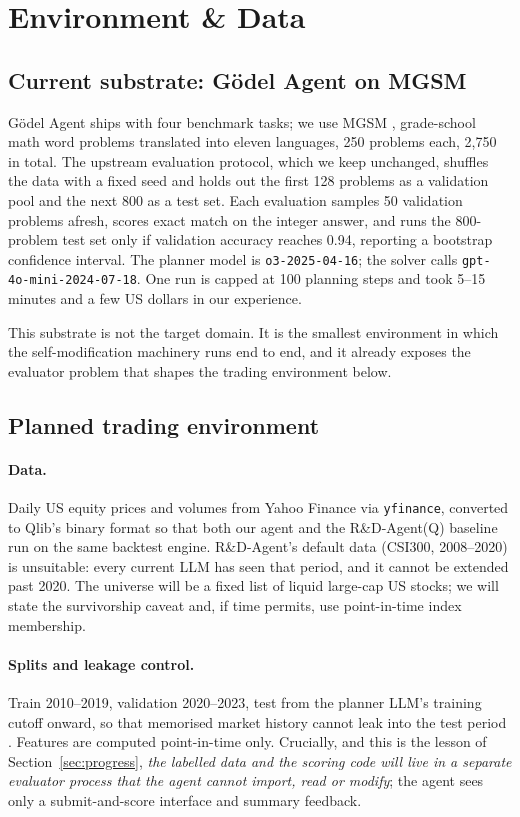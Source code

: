 \documentclass{article}
\begin{document}
\section{Environment \& Data}

\subsection{Current substrate: G\"odel Agent on MGSM}

G\"odel Agent ships with four benchmark tasks; we use MGSM
\citep{shi2022mgsm}, grade-school math word problems translated into eleven
languages, 250 problems each, 2{,}750 in total. The upstream evaluation
protocol, which we keep unchanged, shuffles the data with a fixed seed and
holds out the first 128 problems as a validation pool and the next 800 as a
test set. Each evaluation samples 50 validation problems afresh, scores exact
match on the integer answer, and runs the 800-problem test set only if
validation accuracy reaches 0.94, reporting a bootstrap confidence interval.
The planner model is \texttt{o3-2025-04-16}; the solver calls
\texttt{gpt-4o-mini-2024-07-18}. One run is capped at 100 planning steps and
took 5--15 minutes and a few US dollars in our experience.

This substrate is not the target domain. It is the smallest environment in
which the self-modification machinery runs end to end, and it already
exposes the evaluator problem that shapes the trading environment below.

\subsection{Planned trading environment}

\paragraph{Data.} Daily US equity prices and volumes from Yahoo Finance via
\texttt{yfinance}, converted to Qlib's binary format \citep{yang2020qlib} so
that both our agent and the R\&D-Agent(Q) baseline run on the same backtest
engine. R\&D-Agent's default data (CSI300, 2008--2020) is unsuitable: every
current LLM has seen that period, and it cannot be extended past 2020. The
universe will be a fixed list of liquid large-cap US stocks; we will state the
survivorship caveat and, if time permits, use point-in-time index membership.

\paragraph{Splits and leakage control.} Train 2010--2019, validation
2020--2023, test from the planner LLM's training cutoff onward, so that
memorised market history cannot leak into the test period
\citep{glasserman2023lookahead}. Features are computed point-in-time only.
Crucially, and this is the lesson of Section~\ref{sec:progress}, \emph{the
labelled data and the scoring code will live in a separate evaluator process
that the agent cannot import, read or modify}; the agent sees only a
submit-and-score interface and summary feedback.
\end{document}

